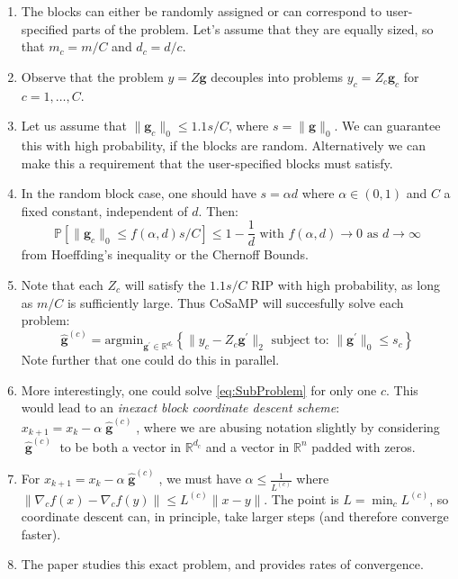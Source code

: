 \documentclass{article}
\DeclareMathOperator{\bfg}{\mathbf{g}}
\begin{document}
\begin{enumerate}
	\item The blocks can either be randomly assigned or can correspond to user-specified parts of the problem. Let's assume that they are equally sized, so that $m_{c} = m/C$ and $d_{c} = d/c$. 
	
	\item Observe that the problem $y = Z\mathbf{g}$ decouples into problems $y_{c} = Z_{c} \mathbf{g}_{c}$ for $c = 1,\ldots, C$. 
	
	\item Let us assume that $\|\mathbf{g}_{c}\|_{0} \leq 1.1 s/C$, where $s = \|\mathbf{g}\|_{0}$. We can guarantee this with high probability, if the blocks are random. Alternatively we can make this a requirement that the user-specified blocks must satisfy. 
	
	\item In the random block case, one should have $s = \alpha d$ where $\alpha\in (0,1)$ and $C$ a fixed constant, independent of $d$. Then:
	$$
	\mathbb{P} \left[\|\mathbf{g}_{c}\|_{0} \leq  f(\alpha,d) s/C \right] \leq 1 - \frac{1}{d} \text{ with } f(\alpha, d) \to 0 \text{ as } d \to \infty 
	$$
	from Hoeffding's inequality or the Chernoff Bounds. 
	\item Note that each $Z_{c}$ will satisfy the $1.1s/C$ RIP with high probability, as long as $m/C$ is sufficiently large. Thus CoSaMP will succesfully solve each problem:
	\begin{equation}
	\hat{\mathbf{g}}^{(c)} = \text{argmin}_{\mathbf{g}^{'}\in\mathbb{R}^{d_{c}}} \left\{ \|y_{c} - Z_{c}\mathbf{g}^{'}\|_{2} \text{ subject to: } \|\mathbf{g}^{'}\|_{0} \leq s_{c}\right\}
	\label{eq:SubProblem}
	\end{equation}
 Note further that one could do this in parallel. 
 
 \item More interestingly, one could solve \eqref{eq:SubProblem} for only one $c$. This would lead to an {\em inexact block coordinate descent scheme}: $x_{k+1} = x_{k} - \alpha \hat{\bfg}^{(c)}$, where we are abusing notation slightly by considering $\hat{\bfg}^{(c)}$ to be both a vector in $\mathbb{R}^{d_c}$ and a vector in $\mathbb{R}^{n}$ padded with zeros. 
 
 \item For $x_{k+1} = x_{k} - \alpha \hat{\bfg}^{(c)}$, we must have $\alpha \leq \frac{1}{L^{(c)}}$ where $\|\nabla_{c}f(x) - \nabla_{c}f(y) \|\leq L^{(c)}\|x- y\|$.  The point is $L = \min_{c} L^{(c)}$, so coordinate descent can, in principle, take larger steps (and therefore converge faster).

\item The paper \cite{tappenden2016inexact} studies this exact problem, and provides rates of convergence. 

\end{enumerate}
\end{document}
